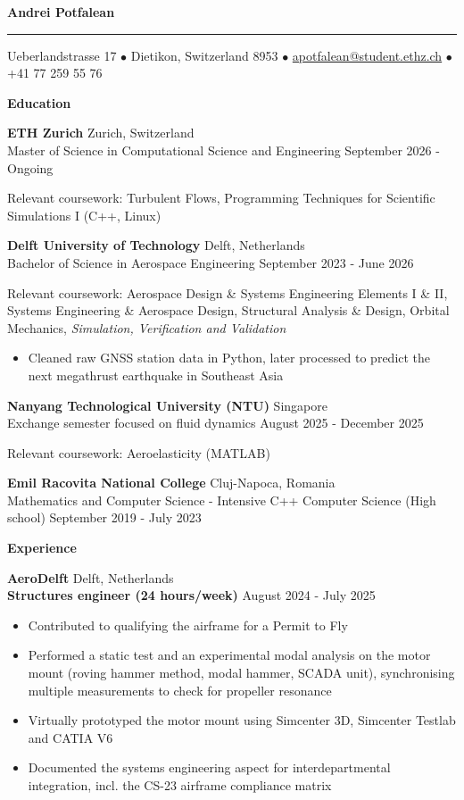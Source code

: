 \documentclass[11pt]{article}
\newcommand{\cvsection}[1]{%
  \vspace{16pt}%
  \centerline{\textbf{#1}}%
  \vspace{8pt}%
}
\newcommand{\cventry}[4]{%
  \textbf{#1} \hfill #2 \\
  #3 \hfill #4\par
}
\newcommand{\cvrole}[4]{%
  \textbf{#1} \hfill #2 \\
  \textbf{#3} \hfill #4\par
}
\newcommand{\cvgap}{\vspace{0.7em}}
\begin{document}
\begin{center}
  {\LARGE\textbf{Andrei Potfalean}}
\end{center}
\vspace{0.8pt}
\hrule
\vspace{18pt}
\centerline{Ueberlandstrasse 17 $\bullet$ Dietikon, Switzerland 8953 $\bullet$
  \href{mailto:apotfalean@student.ethz.ch}{apotfalean@student.ethz.ch} $\bullet$ +41 77 259 55 76}

\cvsection{Education}

\cventry{ETH Zurich}{Zurich, Switzerland}
  {Master of Science in Computational Science and Engineering}{September 2026 - Ongoing}
Relevant coursework: Turbulent Flows, Programming Techniques for Scientific Simulations I (C++, Linux)
\cvgap

\cventry{Delft University of Technology}{Delft, Netherlands}
  {Bachelor of Science in Aerospace Engineering}{September 2023 - June 2026}
Relevant coursework: Aerospace Design \& Systems Engineering Elements I \& II, Systems Engineering \& Aerospace Design, Structural Analysis \& Design, Orbital Mechanics, \textit{Simulation, Verification and Validation}
\begin{itemize}
  \item Cleaned raw GNSS station data in Python, later processed to predict the next megathrust earthquake in Southeast Asia
\end{itemize}
\cvgap

\cventry{Nanyang Technological University (NTU)}{Singapore}
  {Exchange semester focused on fluid dynamics}{August 2025 - December 2025}
Relevant coursework: Aeroelasticity (MATLAB)
\cvgap

\cventry{Emil Racovita National College}{Cluj-Napoca, Romania}
  {Mathematics and Computer Science - Intensive C++ Computer Science (High school)}{September 2019 - July 2023}

\cvsection{Experience}

\cvrole{AeroDelft}{Delft, Netherlands}{Structures engineer (24 hours/week)}{August 2024 - July 2025}
\begin{itemize}
  \item Contributed to qualifying the airframe for a Permit to Fly
  \item Performed a static test and an experimental modal analysis on the motor mount (roving hammer method, modal hammer, SCADA unit), synchronising multiple measurements to check for propeller resonance
  \item Virtually prototyped the motor mount using Simcenter 3D, Simcenter Testlab and CATIA V6
  \item Documented the systems engineering aspect for interdepartmental integration, incl. the CS-23 airframe compliance matrix
\end{itemize}
\cvgap
\end{document}
